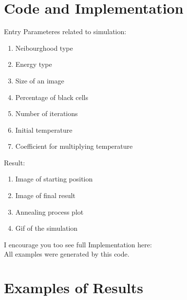 \documentclass{article}
\begin{document}
\section*{Code and Implementation}
Entry Parameteres related to simulation:
\begin{enumerate}
    \item Neibourghood type 
    \item Energy type 
    \item Size of an image 
    \item Percentage of black cells 
    \item Number of iterations
    \item Initial temperature
    \item Coefficient for multiplying temperature
\end{enumerate}
Result:
\begin{enumerate}
    \item Image of starting position
    \item Image of final result 
    \item Annealing process plot 
    \item Gif of the simulation
\end{enumerate}

I encourage you too see full Implementation  here:  
\\
All examples were generated by this code. 

\section*{Examples of Results}
\end{document}
